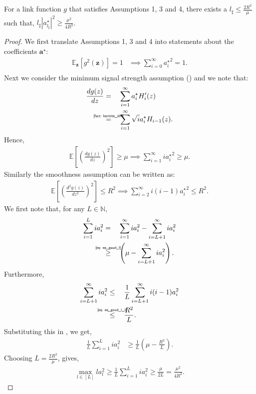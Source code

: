 \documentclass[final,12pt]{colt2018} %
\newcommand{\N}{\mathbb{N}}
\newcommand{\E}{\mathbb{E}}
\newcommand{\explain}[2]{\mathrel{\overset{\makebox[0pt]{\mbox{\normalfont\tiny\sffamily #1}}}{#2}}}
\renewcommand\v[1]{{\ensuremath{\boldsymbol{#1}}}}
\begin{document}
\begin{lemma} For a link function $g$ that satisfies Assumptions 1, 3 and 4, there exists a $l_\sharp \leq \frac{2R^2}{\mu}$ such that, $l_\sharp |a_{l_\sharp}^\star|^2 \geq \frac{\mu^2}{4R^2}$. 
\label{lemma: good_l_restated}
\end{lemma}
\begin{proof}
We first translate Assumptions 1, 3 and 4 into statements about the coefficients $\v a^\star$: 
\begin{align*}
    \E_{\v z} [ g^2(\v z)] = 1 &\implies \sum_{i=0}^\infty {a_i^\star}^2 = 1. \\
\end{align*}
Next we consider the minimum signal strength assumption () and we note that:
\begin{align*}
\frac{d g(z)}{dz} & = \quad \sum_{i=1}^\infty a_i^\star H_i^\prime(z) \\
& \explain{\Cref{fact: hermite_diff}}{=} \quad \sum_{i=1}^\infty \sqrt{i} a_i^\star H_{i-1} (z). 
\end{align*}
Hence,
\begin{align}
    \E \left[ \left( \frac{dg(z)}{dz} \right)^2 \right] \geq \mu \implies \sum_{i=1}^\infty i {a_i^\star}^2 \geq \mu \label{eq: eq_good_l}.
\end{align}
Similarly the smoothness assumption can be written as: 
\begin{align}
    \E \left[ \left( \frac{d^2g(z)}{dz^2} \right)^2 \right] \leq R^2 \implies \sum_{i=2}^\infty i (i-1) {a_i^\star}^2 \leq R^2 \label{eq: eq_good_l_2}.
\end{align}
We first note that, for any $L \in \N$,
\begin{align}
    \sum_{i=1}^L ia_i^2 & = \quad \sum_{i=1}^\infty i a_i^2 - \sum_{i=L+1}^\infty ia_i^2 \nonumber \\
    & \explain{\cref{eq: eq_good_l}}{\geq} \quad  \left( \mu - \sum_{i=L+1}^\infty i a_i^2 \right). \label{eq: eq_good_l_3}
\end{align}
Furthermore,
\begin{align*}
    \sum_{i=L+1}^\infty i a_i^2 &\leq \quad \frac{1}{L} \sum_{i=L+1}^\infty i(i-1) a_i^2 \\
    & \explain{\cref{eq: eq_good_l_2}}{\leq} \quad \frac{R^2}{L}.
\end{align*}
Substituting this in , we get,
\begin{align*}
    \frac{1}{L}\sum_{i=1}^L i a_i^2 & \geq \frac{1}{L} \left( \mu - \frac{R^2}{L} \right).
\end{align*}
Choosing $L = \frac{2R^2}{\mu}$, gives,
\begin{align*}
    \max_{l \in [L]} l a_l^2 \geq \frac{1}{L}\sum_{i=1}^L i a_i^2 \geq \frac{\mu}{2L} = \frac{\mu^2}{4 R^2}.
\end{align*}
\end{proof}
\end{document}
